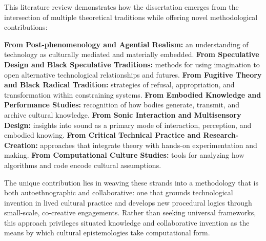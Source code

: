 This literature review demonstrates how the dissertation emerges from the intersection of multiple theoretical traditions while offering novel methodological contributions:

\textbf{From Post-phenomenology and Agential Realism:} an understanding of technology as culturally mediated and materially embedded.
\textbf{From Speculative Design and Black Speculative Traditions:} methods for using imagination to open alternative technological relationships and futures.
\textbf{From Fugitive Theory and Black Radical Tradition:} strategies of refusal, appropriation, and transformation within constraining systems.
\textbf{From Embodied Knowledge and Performance Studies:} recognition of how bodies generate, transmit, and archive cultural knowledge.
\textbf{From Sonic Interaction and Multisensory Design:} insights into sound as a primary mode of interaction, perception, and embodied knowing.
\textbf{From Critical Technical Practice and Research-Creation:} approaches that integrate theory with hands-on experimentation and making.
\textbf{From Computational Culture Studies:} tools for analyzing how algorithms and code encode cultural assumptions.

The unique contribution lies in weaving these strands into a methodology that is both autoethnographic and collaborative: one that grounds technological invention in lived cultural practice and develops new procedural logics through small-scale, co-creative engagements. Rather than seeking universal frameworks, this approach privileges situated knowledge and collaborative invention as the means by which cultural epistemologies take computational form.